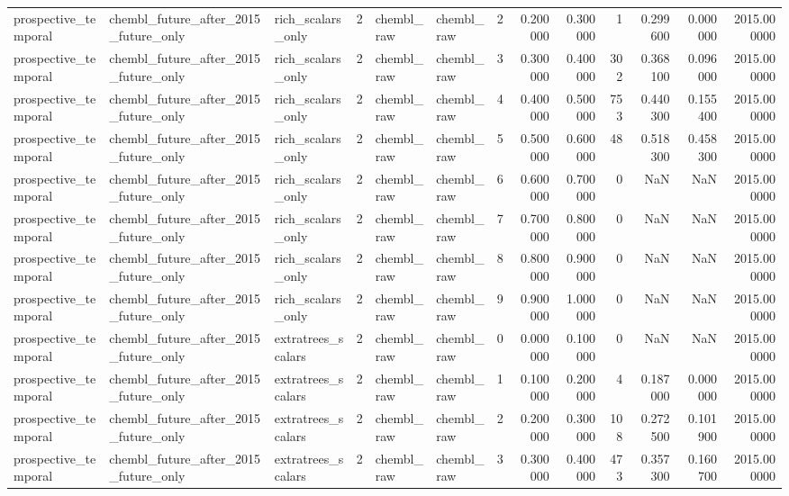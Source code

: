 \begin{longtable}{lllrllrrrrrrr}
prospective\_temporal & chembl\_future\_after\_2015\_future\_only & rich\_scalars\_only & 2 & chembl\_raw & chembl\_raw & 2 & 0.200000 & 0.300000 & 1 & 0.299600 & 0.000000 & 2015.000000 \\
prospective\_temporal & chembl\_future\_after\_2015\_future\_only & rich\_scalars\_only & 2 & chembl\_raw & chembl\_raw & 3 & 0.300000 & 0.400000 & 302 & 0.368100 & 0.096000 & 2015.000000 \\
prospective\_temporal & chembl\_future\_after\_2015\_future\_only & rich\_scalars\_only & 2 & chembl\_raw & chembl\_raw & 4 & 0.400000 & 0.500000 & 753 & 0.440300 & 0.155400 & 2015.000000 \\
prospective\_temporal & chembl\_future\_after\_2015\_future\_only & rich\_scalars\_only & 2 & chembl\_raw & chembl\_raw & 5 & 0.500000 & 0.600000 & 48 & 0.518300 & 0.458300 & 2015.000000 \\
prospective\_temporal & chembl\_future\_after\_2015\_future\_only & rich\_scalars\_only & 2 & chembl\_raw & chembl\_raw & 6 & 0.600000 & 0.700000 & 0 & NaN & NaN & 2015.000000 \\
prospective\_temporal & chembl\_future\_after\_2015\_future\_only & rich\_scalars\_only & 2 & chembl\_raw & chembl\_raw & 7 & 0.700000 & 0.800000 & 0 & NaN & NaN & 2015.000000 \\
prospective\_temporal & chembl\_future\_after\_2015\_future\_only & rich\_scalars\_only & 2 & chembl\_raw & chembl\_raw & 8 & 0.800000 & 0.900000 & 0 & NaN & NaN & 2015.000000 \\
prospective\_temporal & chembl\_future\_after\_2015\_future\_only & rich\_scalars\_only & 2 & chembl\_raw & chembl\_raw & 9 & 0.900000 & 1.000000 & 0 & NaN & NaN & 2015.000000 \\
prospective\_temporal & chembl\_future\_after\_2015\_future\_only & extratrees\_scalars & 2 & chembl\_raw & chembl\_raw & 0 & 0.000000 & 0.100000 & 0 & NaN & NaN & 2015.000000 \\
prospective\_temporal & chembl\_future\_after\_2015\_future\_only & extratrees\_scalars & 2 & chembl\_raw & chembl\_raw & 1 & 0.100000 & 0.200000 & 4 & 0.187000 & 0.000000 & 2015.000000 \\
prospective\_temporal & chembl\_future\_after\_2015\_future\_only & extratrees\_scalars & 2 & chembl\_raw & chembl\_raw & 2 & 0.200000 & 0.300000 & 108 & 0.272500 & 0.101900 & 2015.000000 \\
prospective\_temporal & chembl\_future\_after\_2015\_future\_only & extratrees\_scalars & 2 & chembl\_raw & chembl\_raw & 3 & 0.300000 & 0.400000 & 473 & 0.357300 & 0.160700 & 2015.000000 \\

\end{longtable}
